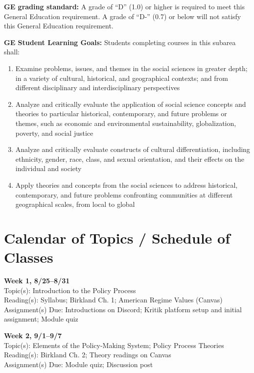 \documentclass[12pt]{article}     %
\begin{document}
\vspace{0.5em}
\noindent \textbf{GE grading standard:}
A grade of ``D'' (1.0) or higher is required to meet this General Education requirement. A grade of ``D-'' (0.7) or below will not satisfy this General Education requirement.

\vspace{0.5em}
\noindent \textbf{GE Student Learning Goals:}
Students completing courses in this subarea shall:
\begin{enumerate}
\item Examine problems, issues, and themes in the social sciences in greater depth; in a variety of cultural, historical, and geographical contexts; and from different disciplinary and interdisciplinary perspectives
\item Analyze and critically evaluate the application of social science concepts and theories to particular historical, contemporary, and future problems or themes, such as economic and environmental sustainability, globalization, poverty, and social justice
\item Analyze and critically evaluate constructs of cultural differentiation, including ethnicity, gender, race, class, and sexual orientation, and their effects on the individual and society
\item Apply theories and concepts from the social sciences to address historical, contemporary, and future problems confronting communities at different geographical scales, from local to global
\end{enumerate}

\section{Calendar of Topics / Schedule of Classes}

\noindent \textbf{Week 1, 8/25--8/31}\\
Topic(s): Introduction to the Policy Process\\
Reading(s): Syllabus; Birkland Ch. 1; American Regime Values (Canvas)\\
Assignment(s) Due: Introductions on Discord; Kritik platform setup and initial assignment; Module quiz\

\noindent \textbf{Week 2, 9/1--9/7}\\
Topic(s): Elements of the Policy-Making System; Policy Process Theories\\
Reading(s): Birkland Ch. 2; Theory readings on Canvas\\
Assignment(s) Due: Module quiz; Discussion post\\
\end{document}
